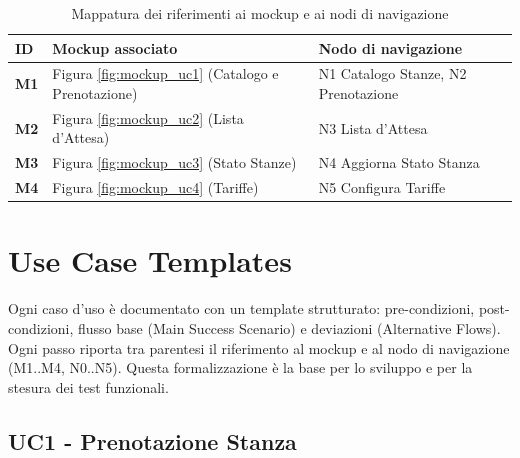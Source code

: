 \begin{table}[H]
    \centering
    \renewcommand{\arraystretch}{1.2}
    \begin{tabularx}{\textwidth}{|>{\bfseries}l|X|X|}
        \hline
        \rowcolor{teal!20}
        ID & Mockup associato & Nodo di navigazione \\ \hline
        M1 & Figura \ref{fig:mockup_uc1} (Catalogo e Prenotazione) & N1 Catalogo Stanze, N2 Prenotazione \\ \hline
        M2 & Figura \ref{fig:mockup_uc2} (Lista d'Attesa) & N3 Lista d'Attesa \\ \hline
        M3 & Figura \ref{fig:mockup_uc3} (Stato Stanze) & N4 Aggiorna Stato Stanza \\ \hline
        M4 & Figura \ref{fig:mockup_uc4} (Tariffe) & N5 Configura Tariffe \\ \hline
    \end{tabularx}
    \caption{Mappatura dei riferimenti ai mockup e ai nodi di navigazione}
    \label{tab:map_mockup_nav}
\end{table}

\clearpage
\section{Use Case Templates}

Ogni caso d'uso è documentato con un template strutturato: pre-condizioni, post-condizioni, flusso base (Main Success Scenario) e deviazioni (Alternative Flows). Ogni passo riporta tra parentesi il riferimento al mockup e al nodo di navigazione (M1..M4, N0..N5). Questa formalizzazione è la base per lo sviluppo e per la stesura dei test funzionali.

\subsection{UC1 - Prenotazione Stanza}

